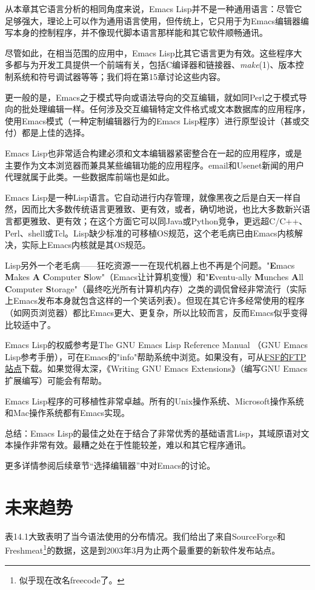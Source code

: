 \documentclass[12pt,oneside]{book}
\begin{document}
从本章其它语言分析的相同角度来说，Emacs Lisp并不是一种通用语言：尽管它足够强大，理论上可以作为通用语言使用，但传统上，它只用于为Emacs编辑器编写本身的控制程序，并不像现代脚本语言那样能和其它软件顺畅通讯。

尽管如此，在相当范围的应用中，Emacs Lisp比其它语言更为有效。这些程序大多都与为开发工具提供一个前端有关，包括C编译器和链接器、\textit{make}(1)、版本控制系统和符号调试器等等；我们将在第15章讨论这些内容。

更一般的是，Emacs之于模式导向或语法导向的交互编辑，就如同Perl之于模式导向的批处理编辑一样。任何涉及交互编辑特定文件格式或文本数据库的应用程序，使用Emacs模式（一种定制编辑器行为的Emacs Lisp程序）进行原型设计（甚或交付）都是上佳的选择。

Emacs Lisp也非常适合构建必须和文本编辑器紧密整合在一起的应用程序，或是主要作为文本浏览器而兼具某些编辑功能的应用程序。email和Usenet新闻的用户代理就属于此类。一些数据库前端也是如此。

Emacs Lisp是一种Lisp语言。它自动进行内存管理，就像黑夜之后是白天一样自然，因而比大多数传统语言更雅致、更有效，或者，确切地说，也比大多数新兴语言都更雅致、更有效；在这个方面它可以同Java或Python竞争，更远超C/C++、Perl、shell或Tcl。Lisp缺少标准的可移植OS规范，这个老毛病已由Emacs内核解决，实际上Emacs内核就是其OS规范。

Lisp另外一个老毛病——狂吃资源一一在现代机器上也不再是个问题。"\textbf{E}macs \textbf{M}akes \textbf{A} \textbf{C}omputer \textbf{S}low"（Emacs让计算机变慢）和"\textbf{E}ventu-ally \textbf{M}unches \textbf{A}ll \textbf{C}omputer \textbf{S}torage"（最终吃光所有计算机内存）之类的调侃曾经非常流行（实际上Emacs发布本身就包含这样的一个笑话列表）。但现在其它许多经常使用的程序（如网页浏览器）都比Emacs更大、更复杂，所以比较而言，反而Emacs似乎变得比较适中了。

Emacs Lisp的权威参考是The GNU Emacs Lisp Reference Manual （GNU Emacs Lisp参考手册），可在Emacs的"info"帮助系统中浏览。如果没有，可从\href{ftp://ftp.gnu.org/pub/gnu}{FSF的FTP站点}下载。如果觉得太深，《Writing GNU Emacs Extensions》（编写GNU Emacs扩展编写）\cite{Glickstein}可能会有帮助。

Emacs Lisp程序的可移植性非常卓越。所有的Unix操作系统、Microsoft操作系统和Mac操作系统都有Emacs实现。

总结：Emacs Lisp的最佳之处在于结合了非常优秀的基础语言Lisp，其域原语对文本操作非常有效。最糟之处在于性能较差，难以和其它程序通讯。

更多详情参阅后续章节“选择编辑器”中对Emacs的讨论。


\section{未来趋势}
表14.1大致表明了当今语法使用的分布情况。我们给出了来自SourceForge和Freshmeat\footnote{似乎现在改名freecode了。}的数据，这是到2003年3月为止两个最重要的新软件发布站点。
\end{document}
